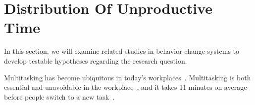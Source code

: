 \section{Distribution Of Unproductive Time}


In this section, we will examine related studies in behavior change systems to develop testable hypotheses regarding the research question.


Multitasking has become ubiquitous in today's workplaces~\cite{Appelbaum2016, mark2015multitasking, CARRIER2009483}. Multitasking is both essential and unavoidable in the workplace~\cite{freedman2007, mark2008cost}, and it takes 11 minutes on average before people switch to a new task~\cite{dabbish2011keep}. 


